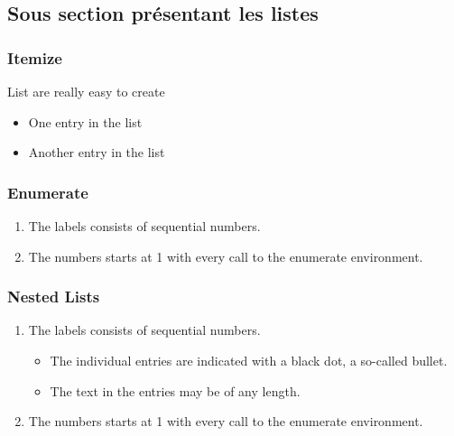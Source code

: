 \subsection{Sous section présentant les listes}

\subsubsection{Itemize}

List are really easy to create
 
\begin{itemize}
  \item One entry in the list
  \item Another entry in the list
\end{itemize}

\subsubsection{Enumerate}

\begin{enumerate}
  \item The labels consists of sequential numbers.
  \item The numbers starts at 1 with every call to the enumerate environment.
\end{enumerate}


\subsubsection{Nested Lists}

\begin{enumerate}
   \item The labels consists of sequential numbers.
   \begin{itemize}
     \item The individual entries are indicated with a black dot, a so-called bullet.
     \item The text in the entries may be of any length.
   \end{itemize}
   \item The numbers starts at 1 with every call to the enumerate environment.
\end{enumerate}


